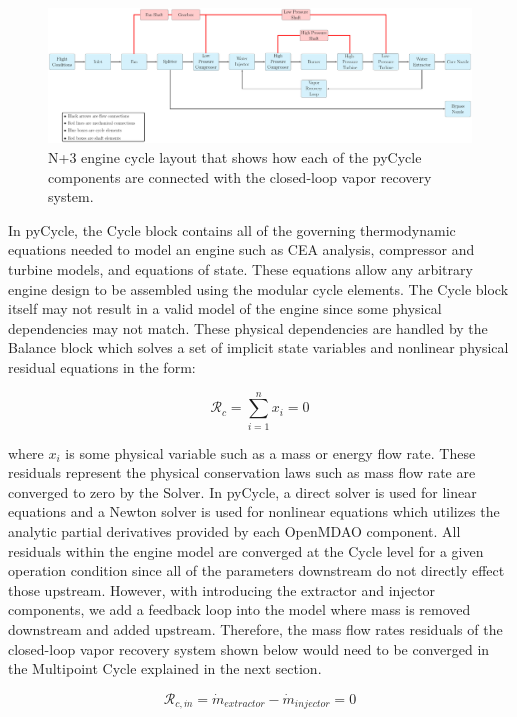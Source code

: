 \documentclass[conf]{new-aiaa}
\begin{document}
\begin{figure}[hbt!]
  \centering
  \includegraphics[width=1.0\textwidth]{N3_CLVR_cycle.pdf}
  \caption{
    N+3 engine cycle layout that shows how each of the pyCycle components are connected with the closed-loop vapor recovery system. %
  }
  \label{fig:n3_clvr}
\end{figure}

In pyCycle, the Cycle block contains all of the governing thermodynamic equations needed to model an engine such as CEA analysis, compressor and turbine models, and equations of state.
These equations allow any arbitrary engine design to be assembled using the modular cycle elements.
The Cycle block itself may not result in a valid model of the engine since some physical dependencies may not match.
These physical dependencies are handled by the Balance block which solves a set of implicit state variables and nonlinear physical residual equations in the form:

\begin{equation}
  \mathcal{R}_c = \sum_{i=1}^{n} x_i = 0
\end{equation}

\noindent
where $x_i$ is some physical variable such as a mass or energy flow rate.
These residuals represent the physical conservation laws such as mass flow rate are converged to zero by the Solver.
In pyCycle, a direct solver is used for linear equations and a Newton solver is used for nonlinear equations which utilizes the analytic partial derivatives provided by each OpenMDAO component.
All residuals within the engine model are converged at the Cycle level for a given operation condition since all of the parameters downstream do not directly effect those upstream.
However, with introducing the extractor and injector components, we add a feedback loop into the model where mass is removed downstream and added upstream.
Therefore, the mass flow rates residuals of the closed-loop vapor recovery system shown below would need to be converged in the Multipoint Cycle explained in the next section.

\begin{equation}
  \mathcal{R}_{c,\dot{m}} = \dot{m}_{extractor} - \dot{m}_{injector} = 0
\end{equation}
\end{document}
